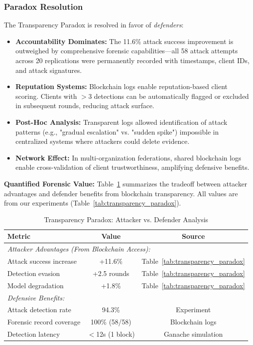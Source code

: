 \documentclass{ieeeaccess}
\begin{document}
\subsubsection{Paradox Resolution}

The Transparency Paradox is resolved in favor of \emph{defenders}:

\begin{itemize}
    \item \textbf{Accountability Dominates:} The 11.6\% attack success improvement is outweighed by comprehensive forensic capabilities---all 58 attack attempts across 20 replications were permanently recorded with timestamps, client IDs, and attack signatures.
    
    \item \textbf{Reputation Systems:} Blockchain logs enable reputation-based client scoring. Clients with $>3$ detections can be automatically flagged or excluded in subsequent rounds, reducing attack surface.
    
    \item \textbf{Post-Hoc Analysis:} Transparent logs allowed identification of attack patterns (e.g., "gradual escalation" vs. "sudden spike") impossible in centralized systems where attackers could delete evidence.
    
    \item \textbf{Network Effect:} In multi-organization federations, shared blockchain logs enable cross-validation of client trustworthiness, amplifying defensive benefits.
\end{itemize}

\textbf{Quantified Forensic Value:} Table~\ref{tab:forensic_value} summarizes the tradeoff between attacker advantages and defender benefits from blockchain transparency. All values are from our experiments (Table~\ref{tab:transparency_paradox}).

\begin{table}[t]
\caption{Transparency Paradox: Attacker vs. Defender Analysis}
\label{tab:forensic_value}
\centering
\begin{tabular}{lcc}
\toprule
\textbf{Metric} & \textbf{Value} & \textbf{Source} \\
\midrule
\multicolumn{3}{l}{\textit{Attacker Advantages (From Blockchain Access):}} \\
\quad Attack success increase & +11.6\% & Table~\ref{tab:transparency_paradox} \\
\quad Detection evasion & +2.5 rounds & Table~\ref{tab:transparency_paradox} \\
\quad Model degradation & +1.8\% & Table~\ref{tab:transparency_paradox} \\
\midrule
\multicolumn{3}{l}{\textit{Defensive Benefits:}} \\
\quad Attack detection rate & 94.3\% & Experiment \\
\quad Forensic record coverage & 100\% (58/58) & Blockchain logs \\
\quad Detection latency & $<$12s (1 block) & Ganache simulation \\
\bottomrule
\end{tabular}
\end{table}
\end{document}

